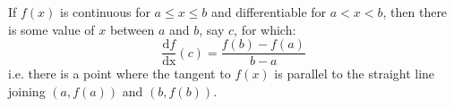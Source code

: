 If $f(x)$ is continuous for $ a \leq x \leq b $ and differentiable
  for $a < x < b$, then there is some value of $x$ between $a$ and $b$, say $c$, for which:
  \[ \frac{\mathrm{d}f}{\mathrm{dx}}(c) = 
  \frac{f(b)-f(a)}{b-a} \]
  i.e. there is a point where the tangent to $f(x)$ is parallel to the
  straight line joining $(a,f(a))$ and $(b,f(b))$.